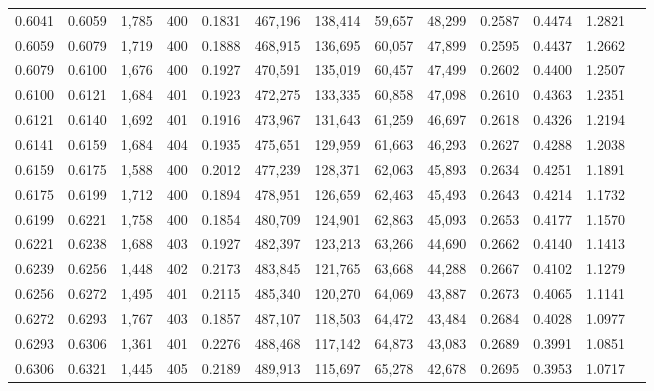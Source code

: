 \begin{tabular}{rrrrrrrrrrrrr}
0.6041 & 0.6059 & 1,785 & 400 &                                     0.1831 & 467,196 & 138,414 &  59,657 &  48,299 & 0.2587 & 0.4474 & 1.2821 \\
0.6059 & 0.6079 & 1,719 & 400 &                                     0.1888 & 468,915 & 136,695 &  60,057 &  47,899 & 0.2595 & 0.4437 & 1.2662 \\
0.6079 & 0.6100 & 1,676 & 400 &                                     0.1927 & 470,591 & 135,019 &  60,457 &  47,499 & 0.2602 & 0.4400 & 1.2507 \\
0.6100 & 0.6121 & 1,684 & 401 &                                     0.1923 & 472,275 & 133,335 &  60,858 &  47,098 & 0.2610 & 0.4363 & 1.2351 \\
0.6121 & 0.6140 & 1,692 & 401 &                                     0.1916 & 473,967 & 131,643 &  61,259 &  46,697 & 0.2618 & 0.4326 & 1.2194 \\
0.6141 & 0.6159 & 1,684 & 404 &                                     0.1935 & 475,651 & 129,959 &  61,663 &  46,293 & 0.2627 & 0.4288 & 1.2038 \\
0.6159 & 0.6175 & 1,588 & 400 &                                     0.2012 & 477,239 & 128,371 &  62,063 &  45,893 & 0.2634 & 0.4251 & 1.1891 \\
0.6175 & 0.6199 & 1,712 & 400 &                                     0.1894 & 478,951 & 126,659 &  62,463 &  45,493 & 0.2643 & 0.4214 & 1.1732 \\
0.6199 & 0.6221 & 1,758 & 400 &                                     0.1854 & 480,709 & 124,901 &  62,863 &  45,093 & 0.2653 & 0.4177 & 1.1570 \\
0.6221 & 0.6238 & 1,688 & 403 &                                     0.1927 & 482,397 & 123,213 &  63,266 &  44,690 & 0.2662 & 0.4140 & 1.1413 \\
0.6239 & 0.6256 & 1,448 & 402 &                                     0.2173 & 483,845 & 121,765 &  63,668 &  44,288 & 0.2667 & 0.4102 & 1.1279 \\
0.6256 & 0.6272 & 1,495 & 401 &                                     0.2115 & 485,340 & 120,270 &  64,069 &  43,887 & 0.2673 & 0.4065 & 1.1141 \\
0.6272 & 0.6293 & 1,767 & 403 &                                     0.1857 & 487,107 & 118,503 &  64,472 &  43,484 & 0.2684 & 0.4028 & 1.0977 \\
0.6293 & 0.6306 & 1,361 & 401 &                                     0.2276 & 488,468 & 117,142 &  64,873 &  43,083 & 0.2689 & 0.3991 & 1.0851 \\
0.6306 & 0.6321 & 1,445 & 405 &                                     0.2189 & 489,913 & 115,697 &  65,278 &  42,678 & 0.2695 & 0.3953 & 1.0717 \\

\end{tabular}
